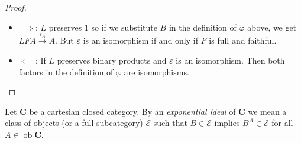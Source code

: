 \documentclass[a4paper]{article}
\renewcommand{\c}[1]{\mathbf{#1}}
\DeclareMathOperator{\ob}{ob}
\begin{document}
\begin{proof}\leavevmode
  \begin{itemize}
  \item \(\implies\): \(L\) preserves \(1\) so if we substitute \(B\) in the definition of \(\varphi\) above, we get \(LFA \xrightarrow{\varepsilon_A} A\). But \(\varepsilon\) is an isomorphism if and only if \(F\) is full and faithful.
  \item \(\impliedby\): If \(L\) preserves binary products and \(\varepsilon\) is an isomorphism. Then both factors in the definition of \(\varphi\) are isomorphisms.
  \end{itemize}
\end{proof}

\begin{definition}
  Let \(\c C\) be a cartesian closed category. By an \emph{exponential ideal} of \(\c C\) we mean a class of objects (or a full subcategory) \(\mathcal E\) such that \(B \in \mathcal E\) implies \(B^A \in \mathcal E\) for all \(A \in \ob \c C\).
\end{definition}
\end{document}
